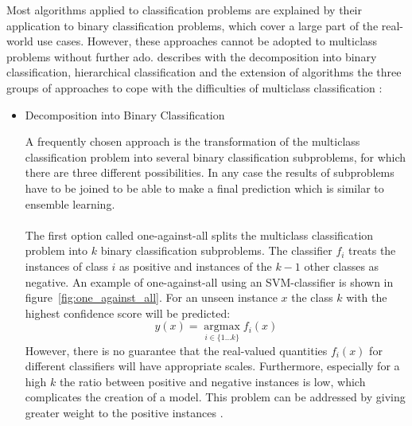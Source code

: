\documentclass[article,type=msc,colorback,accentcolor=tud7b]{tudthesis}
\begin{document}
    Most algorithms applied to classification problems are explained by their application to binary classification problems, which cover a large part of the real-world use cases. However, these approaches cannot be adopted to multiclass problems without further ado. \citeauthor{Aly2005} describes with the decomposition into binary classification, hierarchical classification and the extension of algorithms the three groups of approaches to cope with the difficulties of multiclass classification \autocite{Aly2005}:
    \begin{itemize}
      \item Decomposition into Binary Classification

        A frequently chosen approach is the transformation of the multiclass classification problem into several binary classification subproblems, for which there are three different possibilities. In any case the results of subproblems have to be joined to be able to make a final prediction which is similar to ensemble learning. \\\\
        The first option called one-against-all splits the multiclass classification problem into $k$ binary classification subproblems. The classifier $f_{i}$ treats the instances of class $i$ as positive and instances of the $k-1$ other classes as negative. An example of one-against-all using an SVM-classifier is shown in figure~\ref{fig:one_against_all}. For an unseen instance $x$ the class $k$ with the highest confidence score will be predicted:
        \[y(x)=\underset{i\in\{1 \dots k\}}{\operatorname{argmax}} f_{i}(x)\]
        However, there is no guarantee that the real-valued quantities $f_{i}(x)$ for different classifiers will have appropriate scales. Furthermore, especially for a high $k$ the ratio between positive and negative instances is low, which complicates the creation of a model. This problem can be addressed by giving greater weight to the positive instances \autocite[section~7.1.3]{Bishop2006}.


\end{itemize}
\end{document}
